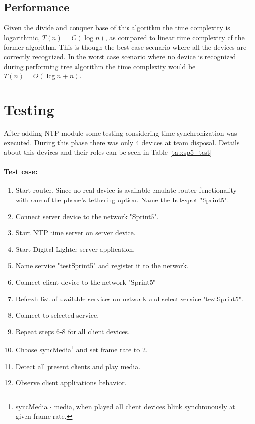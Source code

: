 \subsection{Performance}
Given the divide and conquer base of this algorithm the time complexity is logarithmic, $T(n) = O(\log n)$, as compared to linear time complexity of the former algorithm. This is though the best-case scenario where all the devices are correctly recognized. In the worst case scenario where no device is recognized during performing tree algorithm the time complexity would be $T(n) = O(\log n + n)$.



\section{Testing}
After adding NTP module some testing considering time synchronization was executed. During this phase there was only 4 devices at team disposal. Details about this devices and their roles can be seen in Table \ref{tab:sp5_test}

 

\paragraph{Test case:}
\begin{enumerate}
\item Start router. Since no real device is available emulate router functionality with one of the phone's tethering option. Name the hot-spot "Sprint5". 
\item Connect server device to the network "Sprint5".
\item Start NTP time server on server device.
\item Start Digital Lighter server application.
\item Name service "testSprint5" and register it to the network.
\item Connect client device to the network "Sprint5"
\item Refresh list of available services on network and select service "testSprint5".
\item Connect to selected service.
\item Repeat steps 6-8 for all client devices.  
\item Choose syncMedia\footnote{syncMedia - media, when played all client devices blink synchronously at given frame rate.} and set frame rate to 2.
\item Detect all present clients and play media.
\item Observe client applications behavior.
\end{enumerate}



